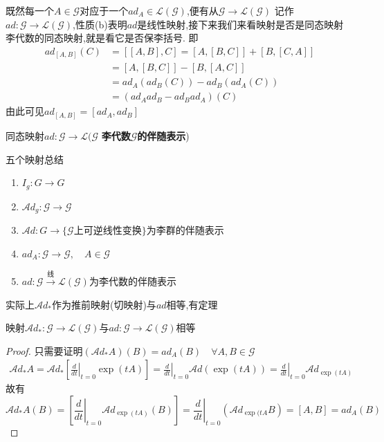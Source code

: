 \documentclass[../main.tex]{subfiles}
\begin{document}
既然每一个$A \in \mathscr{G}$对应于一个$ad_A \in \mathscr{L}(\mathscr{G})$,便有从$\mathscr{G} \rightarrow \mathscr{L}(\mathscr{G})$
记作$ad : \mathscr{G}\rightarrow \mathscr{L}(\mathscr{G})$,性质(b)表明$ad$是线性映射,接下来我们来看映射是否是同态映射
李代数的同态映射,就是看它是否保李括号.
即\begin{align*}
	ad_{[A,B]}(C) & = [[A,B],C] = [A,[B,C]] + [B,[C,A]] \\
	              & = [A,[B,C]] -[B,[A,C]]              \\
	              & = ad_A(ad_B(C)) - ad_B(ad_A(C))     \\
	              & = (ad_A ad_B - ad_B ad_A)(C)
\end{align*}
由此可见$ad_{[A,B]} = [ad_A,ad_B]$
\begin{definition}
	同态映射$ad:\mathscr{G} \rightarrow \mathscr{L}(\mathscr{G}$ \textbf{李代数$\mathscr{G}$的伴随表示})
\end{definition}
五个映射总结\begin{enumerate}
	\item $I_g:G\rightarrow G$
	\item $\mathscr{A}\!d_g: \mathscr{G} \rightarrow \mathscr{G}$
	\item $\mathscr{A}\!d :G \rightarrow \{ \mathscr{G}\text{上可逆线性变换}\}$为李群的伴随表示
	\item $ad_A:\mathscr{G}\rightarrow \mathscr{G},\quad A\in \mathscr{G}$
	\item $ad : \mathscr{G} \xrightarrow{\text{线}} \mathscr{L}(\mathscr{G})$为李代数的伴随表示
\end{enumerate}
实际上$\mathscr{A}\!d_*$作为推前映射(切映射)与$ad$相等,有定理
\begin{theorem}
	映射$\mathscr{A}\!d_{*}: \mathscr{G} \rightarrow \mathscr{L}(\mathscr{G})$与$ad:\mathscr{G}\rightarrow \mathscr{L}(\mathscr{G})$相等
\end{theorem}
\begin{proof}
	只需要证明$(\mathscr{A}\!d_*A)(B) = ad_A(B)\quad \forall A,B \in \mathscr{G}$
	\begin{align*}
		\mathscr{A}\!d_* A = \mathscr{A}\!d_* [\left.\frac{d}{dt}\right|_{t=0}\exp(tA)] =   \left.\frac{d}{dt}\right|_{t=0}\mathscr{A}\!d(\exp (tA)) = \left.\frac{d}{dt}\right|_{t=0} \mathscr{A}\!d_{\exp(tA)}
	\end{align*}
	故有$$
		\mathscr{A}\!d_*A(B) = [\left.\frac{d}{dt}\right|_{t=0} \mathscr{A}\!d_{\exp(tA)}(B)] = \left.\frac{d}{dt}\right|_{t=0}(\mathscr{A}\!d_{\exp(tA}B) = [A,B] = ad_A(B)$$

\end{proof}
\end{document}
